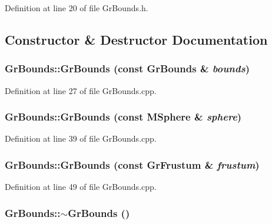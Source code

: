 Definition at line 20 of file GrBounds.h.

\subsection{Constructor \& Destructor Documentation}
\hypertarget{class_gr_bounds_a97153d6b3daf25ac80e354056c04b16}{
\subsubsection[{GrBounds}]{\setlength{\rightskip}{0pt plus 5cm}GrBounds::GrBounds (const {\bf GrBounds} \& {\em bounds})}}
\label{class_gr_bounds_a97153d6b3daf25ac80e354056c04b16}




Definition at line 27 of file GrBounds.cpp.\hypertarget{class_gr_bounds_e752149dfcef2c99dd72e168b5caec09}{
\subsubsection[{GrBounds}]{\setlength{\rightskip}{0pt plus 5cm}GrBounds::GrBounds (const {\bf MSphere} \& {\em sphere})}}
\label{class_gr_bounds_e752149dfcef2c99dd72e168b5caec09}




Definition at line 39 of file GrBounds.cpp.\hypertarget{class_gr_bounds_2483e4edd983af5995ad2696fcc04299}{
\subsubsection[{GrBounds}]{\setlength{\rightskip}{0pt plus 5cm}GrBounds::GrBounds (const {\bf GrFrustum} \& {\em frustum})}}
\label{class_gr_bounds_2483e4edd983af5995ad2696fcc04299}




Definition at line 49 of file GrBounds.cpp.\hypertarget{class_gr_bounds_85739bbb8c8b44e95606b996e8fc576d}{
\subsubsection[{$\sim$GrBounds}]{\setlength{\rightskip}{0pt plus 5cm}GrBounds::$\sim$GrBounds ()}}
\label{class_gr_bounds_85739bbb8c8b44e95606b996e8fc576d}




